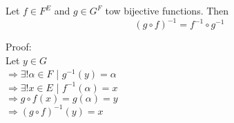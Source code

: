 \documentclass{article}
\begin{document}
\noindent Let $f \in F^E$ and $g \in G^F$ tow bijective functions. Then \\
\[
(g \circ f)^{-1} = f^{-1} \circ g^{-1}
\]

\noindent Proof:\\
Let $y \in G$\\
$\Rightarrow \exists! \alpha  \in F $ | $ g^{-1}(y) = \alpha$\\
$\Rightarrow \exists! x \in E $ | $ f^{-1}(\alpha) = x$\\
$\Rightarrow g \circ f(x) = g(\alpha) = y $\\
$\Rightarrow (g \circ f)^{-1}(y)  = x $\\
\end{document}
